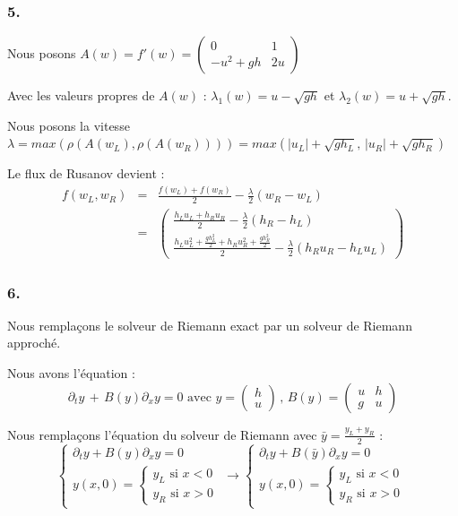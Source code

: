 \documentclass{article}
\begin{document}
\subsubsection*{5.}

Nous posons $A(w) = f'(w) = \begin{pmatrix} 0 & 1 \\ -u^2+gh & 2u \end{pmatrix}$

Avec les valeurs propres de $A(w)$ : $\lambda_1(w) = u - \sqrt{gh}$ et $\lambda_2(w) = u + \sqrt{gh}$.

Nous posons la vitesse $\lambda = max(\rho(A(w_L), \rho(A(w_R)))) = max(|u_L|+\sqrt{gh_L}, \, |u_R|+\sqrt{gh_R})$

Le flux de Rusanov devient :
\begin{eqnarray*}
    f(w_L, w_R) &=& \frac{f(w_L) + f(w_R)}{2} - \frac{\lambda}{2} (w_R - w_L) \\
    &=& \begin{pmatrix} \frac{h_L u_L + h_R u_R}{2} - \frac{\lambda}{2} (h_R-h_L) \\
                        \frac{h_L u_L^2 + \frac{g h_L^2}{2} + h_R u_R^2 + \frac{g h_R^2}{2}}{2} - \frac{\lambda}{2} (h_R u_R - h_L u_L) \end{pmatrix}
\end{eqnarray*}

\subsubsection*{6.}

Nous remplaçons le solveur de Riemann exact par un solveur de Riemann approché.

Nous avons l'équation :
\[ \partial_t y \, + \, B(y) \partial_x y = 0 \text{ avec } y = \begin{pmatrix} h \\ u \end{pmatrix} \, , \, B(y)=\begin{pmatrix} u & h \\ g & u \end{pmatrix} \]

Nous remplaçons l'équation du solveur de Riemann avec $\bar{y} = \frac{y_L+y_R}{2}$ :
\[ \left\{ \begin{matrix} \partial_t y + B(y) \partial_x y = 0 \\ y(x,0) = \left\{ \begin{matrix} y_L \text{ si } x<0 \\ y_R \text{ si } x>0 \end{matrix} \right. \end{matrix} \right.
    \longrightarrow
    \left\{ \begin{matrix} \partial_t y + B(\bar{y}) \partial_x y = 0 \\ y(x,0) = \left\{ \begin{matrix} y_L \text{ si } x<0 \\ y_R \text{ si } x>0 \end{matrix} \right. \end{matrix} \right.
\]
\end{document}
